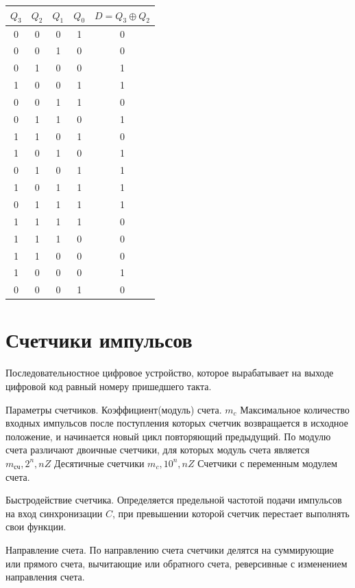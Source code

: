 \documentclass[a4paper]{article}
\begin{document}
\begin{table}[ht]
\centering
\begin{tabular}{|c|c|c|c|c|}
\hline
$Q_3$ & $Q_2$ & $Q_1$ & $Q_0$ & $D = Q_3 \oplus Q_2$ \\
\hline
0 & 0 & 0 & 1 & 0 \\
0 & 0 & 1 & 0 & 0 \\
0 & 1 & 0 & 0 & 1 \\
1 & 0 & 0 & 1 & 1 \\
\hline
0 & 0 & 1 & 1 & 0 \\
0 & 1 & 1 & 0 & 1 \\
1 & 1 & 0 & 1 & 0 \\
1 & 0 & 1 & 0 & 1 \\
\hline
0 & 1 & 0 & 1 & 1 \\
1 & 0 & 1 & 1 & 1 \\
0 & 1 & 1 & 1 & 1 \\
1 & 1 & 1 & 1 & 0 \\
\hline
1 & 1 & 1 & 0 & 0 \\
1 & 1 & 0 & 0 & 0 \\
1 & 0 & 0 & 0 & 1 \\
0 & 0 & 0 & 1 & 0 \\
\hline
\end{tabular}
\end{table}

\section{Счетчики импульсов}
Последовательностное цифровое устройство, которое вырабатывает на выходе цифровой код равный номеру пришедшего такта.

Параметры счетчиков. Коэффициент(модуль) счета. $m_c$
    Максимальное количество входных импульсов после поступления которых счетчик возвращается в исходное положение, и начинается новый цикл повторяющий предыдущий.
    По модулю счета различают двоичные счетчики, для которых модуль счета является $m_{\text{сч}}, 2^n, n Z$
    Десятичные счетчики $m_c, 10^n, n Z$
    Счетчики с переменным модулем счета.

    Быстродействие счетчика. Определяется предельной частотой подачи импульсов на вход синхронизации $C$, при превышении которой счетчик перестает выполнять свои функции.

    Направление счета. 
    По направлению счета счетчики делятся на суммирующие или прямого счета,
    вычитающие или обратного счета, реверсивные с изменением направления счета.
\end{document}
